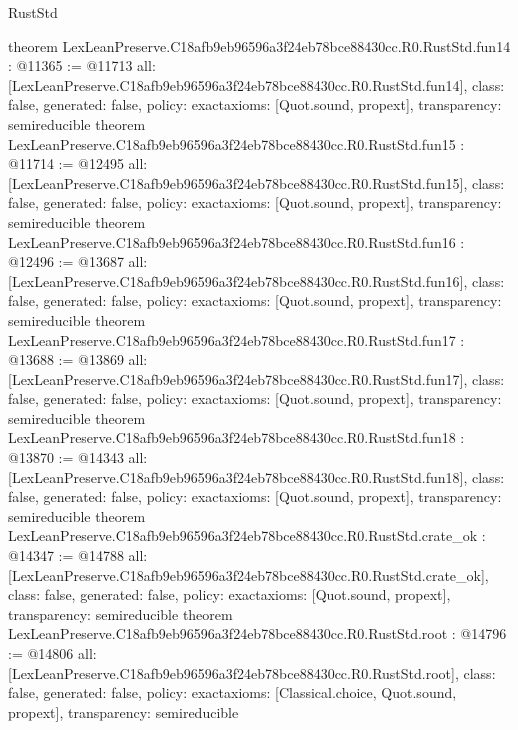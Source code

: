 \begin{lexlean}{RustStd}
\begin{coremodule}
{}
theorem LexLeanPreserve.C18afb9eb96596a3f24eb78bce88430cc.R0.RustStd.fun14 : @11365 := @11713 {
  all: [LexLeanPreserve.C18afb9eb96596a3f24eb78bce88430cc.R0.RustStd.fun14],
  class: false,
  generated: false,
  policy: exact{axioms: [Quot.sound, propext]},
  transparency: semireducible
}
theorem LexLeanPreserve.C18afb9eb96596a3f24eb78bce88430cc.R0.RustStd.fun15 : @11714 := @12495 {
  all: [LexLeanPreserve.C18afb9eb96596a3f24eb78bce88430cc.R0.RustStd.fun15],
  class: false,
  generated: false,
  policy: exact{axioms: [Quot.sound, propext]},
  transparency: semireducible
}
theorem LexLeanPreserve.C18afb9eb96596a3f24eb78bce88430cc.R0.RustStd.fun16 : @12496 := @13687 {
  all: [LexLeanPreserve.C18afb9eb96596a3f24eb78bce88430cc.R0.RustStd.fun16],
  class: false,
  generated: false,
  policy: exact{axioms: [Quot.sound, propext]},
  transparency: semireducible
}
theorem LexLeanPreserve.C18afb9eb96596a3f24eb78bce88430cc.R0.RustStd.fun17 : @13688 := @13869 {
  all: [LexLeanPreserve.C18afb9eb96596a3f24eb78bce88430cc.R0.RustStd.fun17],
  class: false,
  generated: false,
  policy: exact{axioms: [Quot.sound, propext]},
  transparency: semireducible
}
theorem LexLeanPreserve.C18afb9eb96596a3f24eb78bce88430cc.R0.RustStd.fun18 : @13870 := @14343 {
  all: [LexLeanPreserve.C18afb9eb96596a3f24eb78bce88430cc.R0.RustStd.fun18],
  class: false,
  generated: false,
  policy: exact{axioms: [Quot.sound, propext]},
  transparency: semireducible
}
theorem LexLeanPreserve.C18afb9eb96596a3f24eb78bce88430cc.R0.RustStd.crate_ok : @14347 := @14788 {
  all: [LexLeanPreserve.C18afb9eb96596a3f24eb78bce88430cc.R0.RustStd.crate_ok],
  class: false,
  generated: false,
  policy: exact{axioms: [Quot.sound, propext]},
  transparency: semireducible
}
theorem LexLeanPreserve.C18afb9eb96596a3f24eb78bce88430cc.R0.RustStd.root : @14796 := @14806 {
  all: [LexLeanPreserve.C18afb9eb96596a3f24eb78bce88430cc.R0.RustStd.root],
  class: false,
  generated: false,
  policy: exact{axioms: [Classical.choice, Quot.sound, propext]},
  transparency: semireducible
}


\end{coremodule}
\end{lexlean}
